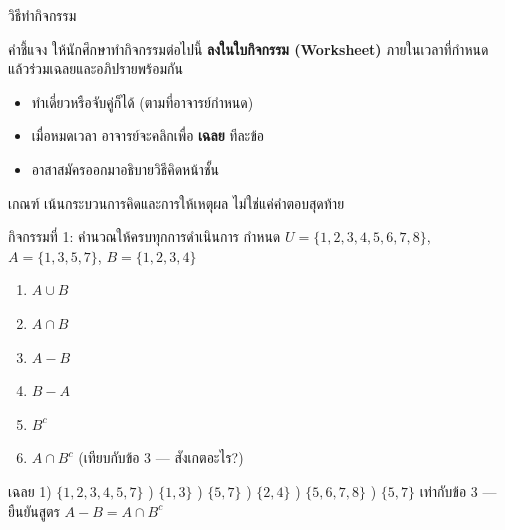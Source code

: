 \begin{frame}{วิธีทำกิจกรรม}
  \begin{block}{คำชี้แจง}
    ให้นักศึกษาทำกิจกรรมต่อไปนี้ \textbf{ลงในใบกิจกรรม (Worksheet)} ภายในเวลาที่กำหนด
    แล้วร่วมเฉลยและอภิปรายพร้อมกัน
  \end{block}
  \vspace{0.5em}
  \begin{itemize}
    \item ทำเดี่ยวหรือจับคู่ก็ได้ (ตามที่อาจารย์กำหนด)
    \item เมื่อหมดเวลา อาจารย์จะคลิกเพื่อ \textbf{เฉลย} ทีละข้อ
    \item อาสาสมัครออกมาอธิบายวิธีคิดหน้าชั้น
  \end{itemize}
  \vspace{0.5em}
  \begin{exampleblock}{เกณฑ์}
    เน้นกระบวนการคิดและการให้เหตุผล ไม่ใช่แค่คำตอบสุดท้าย
  \end{exampleblock}
\end{frame}

\begin{frame}{กิจกรรมที่ 1: คำนวณให้ครบทุกการดำเนินการ }
  กำหนด $U = \{1, 2, 3, 4, 5, 6, 7, 8\}$, \quad $A = \{1, 3, 5, 7\}$, \quad $B = \{1, 2, 3, 4\}$
  \begin{enumerate}
    \item $A \cup B$
    \item $A \cap B$
    \item $A - B$
    \item $B - A$
    \item $B^c$
    \item $A \cap B^c$ \quad (เทียบกับข้อ 3 --- สังเกตอะไร?)
  \end{enumerate}
  \pause
  \begin{exampleblock}{เฉลย}
    \footnotesize
    1) $\{1,2,3,4,5,7\}$ ) $\{1,3\}$ ) $\{5,7\}$ ) $\{2,4\}$ ) $\{5,6,7,8\}$ ) $\{5,7\}$ เท่ากับข้อ 3 --- ยืนยันสูตร $A - B = A \cap B^c$
  \end{exampleblock}
\end{frame}

